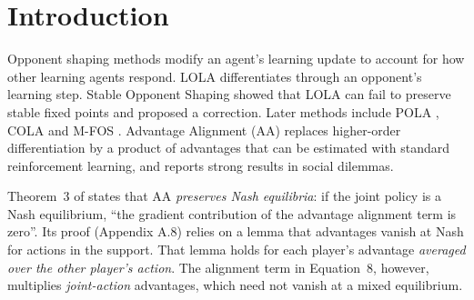 \documentclass[11pt]{article}
\theoremstyle{remark}
\begin{document}
\begin{abstract}
conditional covariance identity, the failure of invariance under strategic equivalence and the gating characterization have machine-checked proofs in Lean~4 with Mathlib. The state aggregation and the memory control are derived analytically and checked with exact arithmetic.
\end{abstract}

\section{Introduction}

Opponent shaping methods modify an agent's learning update to account for how other learning agents respond. LOLA \citep{foerster2018lola} differentiates through an opponent's learning step. Stable Opponent Shaping \citep{letcher2019sos} showed that LOLA can fail to preserve stable fixed points and proposed a correction. Later methods include POLA \citep{zhao2022pola}, COLA \citep{willi2022cola} and M-FOS \citep{lu2022mfos}. Advantage Alignment (AA) \citep{duque2025aa} replaces higher-order differentiation by a product of advantages that can be estimated with standard reinforcement learning, and reports strong results in social dilemmas.

Theorem~3 of \citet{duque2025aa} states that AA \emph{preserves Nash equilibria}: if the joint policy is a Nash equilibrium, ``the gradient contribution of the advantage alignment term is zero''. Its proof (Appendix A.8) relies on a lemma that advantages vanish at Nash for actions in the support. That lemma holds for each player's advantage \emph{averaged over the other player's action}. The alignment term in Equation~8, however, multiplies \emph{joint-action} advantages, which need not vanish at a mixed equilibrium.
\end{document}
